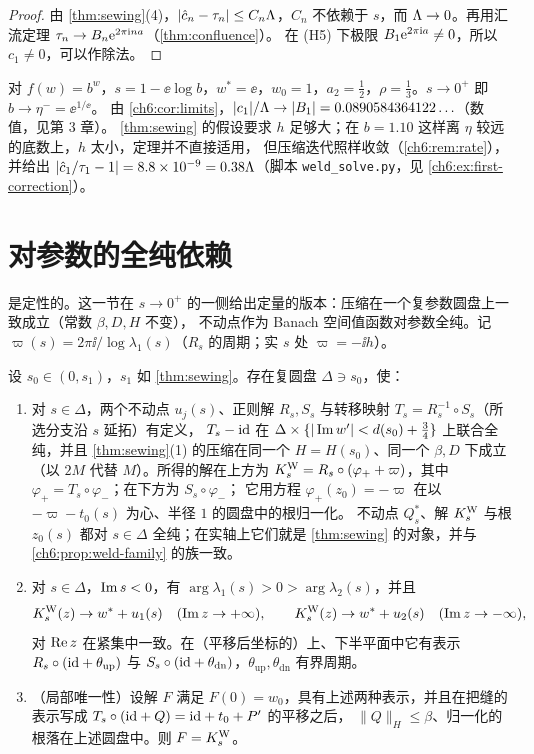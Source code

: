\begin{proof}
由 \cref{thm:sewing}(4)，$|\hat c_n-\tau_n|\le C_n\Lambda$，$C_n$ 不依赖于 $s$，而 $\Lambda\to0$。再用汇流定理 $\tau_n\to B_n\mathrm{e}^{2\pi\mathrm{i} na}$（\cref{thm:confluence}）。
在 (H5) 下极限 $B_1\mathrm{e}^{2\pi\mathrm{i} a}\ne0$，所以 $c_1\ne0$，可以作除法。
\end{proof}

\begin{example}[tetration]\label{ch6:ex:tetration}
对 $f(w)=b^w$，$s=1-\ee\log b$，$w^*=\ee$，$w_0=1$，$a_2=\tfrac12$，$\rho=\tfrac13$。$s\to0^+$ 即 $b\to\eta^-=\ee^{1/\ee}$。
由 \cref{ch6:cor:limits}，$|c_1|/\Lambda\to|B_1|=0.0890584364122\ldots$（数值，见第 3 章）。
\cref{thm:sewing} 的假设要求 $h$ 足够大；在 $b=1.10$ 这样离 $\eta$ 较远的底数上，$h$ 太小，定理并不直接适用，
但压缩迭代照样收敛（\cref{ch6:rem:rate}），并给出 $|\hat c_1/\tau_1-1|=8.8\times10^{-9}=0.38\Lambda$（脚本 \texttt{weld\_solve.py}，见 \cref{ch6:ex:first-correction}）。
\end{example}

\section{对参数的全纯依赖}\label{ch6:sec:parameter}

 是定性的。这一节在 $s\to0^+$ 的一侧给出定量的版本：压缩在一个复参数圆盘上一致成立（常数 $\beta,D,H$ 不变），
不动点作为 Banach 空间值函数对参数全纯。记 $\varpi(s)=2\pi\ii/\log\lambda_1(s)$（$R_s$ 的周期；实 $s$ 处 $\varpi=-\ii h$）。

\begin{theorem}[参数依赖]\label{ch6:thm:parameter}
设 $s_0\in(0,s_1)$，$s_1$ 如 \cref{thm:sewing}。存在复圆盘 $\Delta\ni s_0$，使：
\begin{enumerate}
\item 对 $s\in\Delta$，两个不动点 $u_j(s)$、正则解 $R_s,S_s$ 与转移映射 $T_s=R_s^{-1}\circ S_s$（所选分支沿 $s$ 延拓）有定义，
 $T_s-\mathrm{id}$ 在 $\Delta\times\{|\operatorname{Im} w'|<d(s_0)+\tfrac34\}$ 上联合全纯，并且 \cref{thm:sewing}(1) 的压缩在同一个 $H=H(s_0)$、同一个 $\beta,D$ 下成立
 （以 $2M$ 代替 $M$）。所得的解在上方为 $K^{\mathrm W}_s=R_s\circ(\varphi_++\varpi)$，其中 $\varphi_+=T_s\circ\varphi_-$；在下方为 $S_s\circ\varphi_-$；
 它用方程 $\varphi_+(z_0)=-\varpi$ 在以 $-\varpi-t_0(s)$ 为心、半径 $1$ 的圆盘中的根归一化。
 不动点 $Q^*_s$、解 $K^{\mathrm W}_s$ 与根 $z_0(s)$ 都对 $s\in\Delta$ 全纯；在实轴上它们就是 \cref{thm:sewing} 的对象，并与 \cref{ch6:prop:weld-family} 的族一致。
\item 对 $s\in\Delta$，$\operatorname{Im} s<0$，有 $\arg\lambda_1(s)>0>\arg\lambda_2(s)$，并且
 \[
  K^{\mathrm W}_s(z)\to w^*+u_1(s)\quad(\operatorname{Im} z\to+\infty),\qquad K^{\mathrm W}_s(z)\to w^*+u_2(s)\quad(\operatorname{Im} z\to-\infty),
 \]
 对 $\operatorname{Re} z$ 在紧集中一致。在（平移后坐标的）上、下半平面中它有表示 $R_s\circ(\mathrm{id}+\theta_{\mathrm{up}})$ 与 $S_s\circ(\mathrm{id}+\theta_{\mathrm{dn}})$，$\theta_{\mathrm{up}},\theta_{\mathrm{dn}}$ 有界周期。
\item （局部唯一性）设解 $F$ 满足 $F(0)=w_0$，具有上述两种表示，并且在把缝的表示写成 $T_s\circ(\mathrm{id}+Q)=\mathrm{id}+t_0+P'$ 的平移之后，
 $\|Q\|_H\le\beta$、归一化的根落在上述圆盘中。则 $F=K^{\mathrm W}_s$。
\end{enumerate}
\end{theorem}

